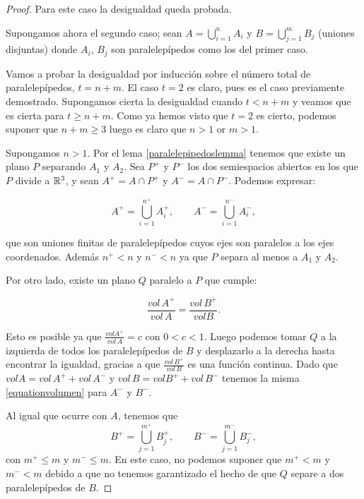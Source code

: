 \begin{proof}
Para este caso la desigualdad queda probada.

Supongamos ahora el segundo caso; sean $A = \displaystyle\bigcup_{i=1}^n A_i$ y $B = \displaystyle\bigcup_{j=1}^m B_j$ (uniones disjuntas) donde $A_i$, $B_j$ son paralelepípedos como los del primer caso.

Vamos a probar la desigualdad por inducción sobre el número total de paralelepípedos, $t = n + m$.
El caso $t=2$ es claro, pues es el caso previamente demostrado.
Supongamos cierta la desigualdad cuando $t < n + m$ y veamos que es cierta para $t \geq n + m$. Como ya hemos visto que $t=2$ es cierto, podemos suponer que $n + m \geq 3$ luego es claro que $n > 1$ or $m > 1$.

Supongamos $n > 1$. Por el lema \ref{paralelepipedoslemma} tenemos que existe un plano $P$ separando $A_1$ y $A_2$. Sea $P^+$ y $P^-$ los dos semiespacios abiertos en los que $P$ divide a $\mathbb{R}^3$, y sean $A^+ = A \cap P^+$ y $A^- = A \cap P^-$. Podemos expresar:

\begin{equation*}
    A^+ = \displaystyle\bigcup_{i=1}^{n^+} A_i^+, \qquad A^- = \displaystyle\bigcup_{i=1}^{n^-} A_i^-,
\end{equation*}

que son uniones finitas de paralelepípedos cuyos ejes son paralelos a los ejes coordenados. Además $n^+ < n$ y $n^- < n$ ya que $P$ separa al menos a $A_1$ y $A_2$.

Por otro lado, existe un plano $Q$ paralelo a $P$ que cumple:

\begin{equation}\label{equationvolumen}
    \frac{vol \, A^+}{vol \, A} = \frac{vol \, B^+}{vol B}.
\end{equation}

Esto es posible ya que $\frac{vol A^+}{vol \, A} = c$ con $0 < c < 1$. Luego podemos tomar $Q$ a la izquierda de todos los paralelepípedos de $B$ y desplazarlo a la derecha hasta encontrar la igualdad, gracias a que $\frac{vol \, B^+}{vol \, B}$ es una función continua.
Dado que $vol A = vol \, A^+ + vol \, A^-$ y $vol \, B = vol B^+ + vol \, B^-$ tenemos la misma \ref{equationvolumen} para $A^-$ y $B^-$.

Al igual que ocurre con $A$, tenemos que 
%
\begin{equation*}
    B^+ = \displaystyle\bigcup_{j=1}^{m^+} B_j^+, \qquad B^- = \displaystyle\bigcup_{j=1}^{m^-} B_j^-,
\end{equation*}
%
con $m^+ \leq m$ y $m^- \leq m$. En este caso, no podemos suponer que $m^+ < m$ y $m^- < m$ debido a que no tenemos garantizado el hecho de que $Q$ separe a dos paralelepípedos de $B$.


\end{proof}
